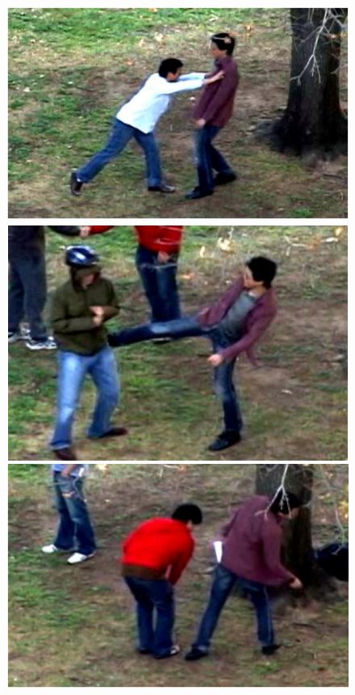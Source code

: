 \begin{figure}[!t]
\begin{center}
\includegraphics[scale=0.32]{cvpr14_figures/dataset_thumb/uti/crop_class3.pdf} 
\includegraphics[scale=0.32]{cvpr14_figures/dataset_thumb/uti/crop_class4.pdf} 
\includegraphics[scale=0.32]{cvpr14_figures/dataset_thumb/uti/crop_class5.pdf} 

\end{center}
\end{figure}
